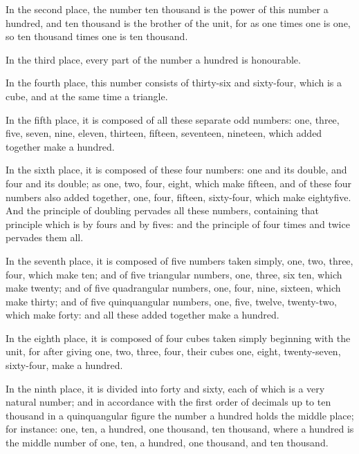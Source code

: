 In the second place, the number ten thousand is the power of this number a hundred, and ten
thousand is the brother of the unit, for as one times one is one, so ten thousand times one is ten
thousand.

In the third place, every part of the number a hundred is honourable.

In the fourth place, this number consists of thirty-six and sixty-four, which is a cube, and at the
same time a triangle.

In the fifth place, it is composed of all these separate odd numbers: one, three, five, seven, nine,
eleven, thirteen, fifteen, seventeen, nineteen, which added together make a hundred.

In the sixth place, it is composed of these four numbers: one and its double, and four and its
double; as one, two, four, eight, which make fifteen, and of these four numbers also added
together, one, four, fifteen, sixty-four, which make eightyfive. And the principle of doubling
pervades all these numbers, containing that principle which is by fours and by fives: and the
principle of four times and twice pervades them all.

In the seventh place, it is composed of five numbers taken simply, one, two, three, four, which
make ten; and of five triangular numbers, one, three, six ten, which make twenty; and of five
quadrangular numbers, one, four, nine, sixteen, which make thirty; and of five quinquangular
numbers, one, five, twelve, twenty-two, which make forty: and all these added together make a
hundred.

In the eighth place, it is composed of four cubes taken simply beginning with the unit, for after
giving one, two, three, four, their cubes one, eight, twenty-seven, sixty-four, make a hundred.

In the ninth place, it is divided into forty and sixty, each of which is a very natural number; and in
accordance with the first order of decimals up to ten thousand in a quinquangular figure the number
a hundred holds the middle place; for instance: one, ten, a hundred, one thousand, ten thousand,
where a hundred is the middle number of one, ten, a hundred, one thousand, and ten thousand.

